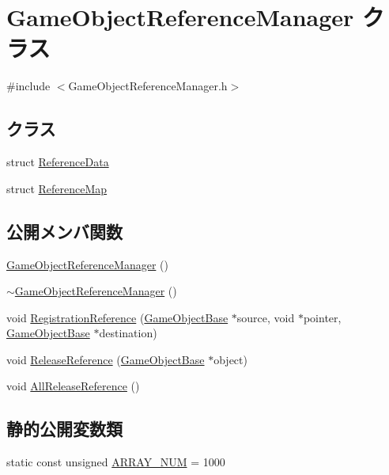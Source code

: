 \hypertarget{class_game_object_reference_manager}{}\section{Game\+Object\+Reference\+Manager クラス}
\label{class_game_object_reference_manager}


{\ttfamily \#include $<$Game\+Object\+Reference\+Manager.\+h$>$}

\subsection*{クラス}
\begin{DoxyCompactItemize}
\item 
struct \mbox{\hyperlink{struct_game_object_reference_manager_1_1_reference_data}{Reference\+Data}}
\item 
struct \mbox{\hyperlink{struct_game_object_reference_manager_1_1_reference_map}{Reference\+Map}}
\end{DoxyCompactItemize}
\subsection*{公開メンバ関数}
\begin{DoxyCompactItemize}
\item 
\mbox{\hyperlink{class_game_object_reference_manager_aed165af9f1a16894c65f974945020cda}{Game\+Object\+Reference\+Manager}} ()
\item 
\mbox{\hyperlink{class_game_object_reference_manager_a9ed62220afb840cdc3e8cbe4bbc3a19e}{$\sim$\+Game\+Object\+Reference\+Manager}} ()
\item 
void \mbox{\hyperlink{class_game_object_reference_manager_a4195eafdda534044454b6d48efc7d03d}{Registration\+Reference}} (\mbox{\hyperlink{class_game_object_base}{Game\+Object\+Base}} $\ast$source, void $\ast$pointer, \mbox{\hyperlink{class_game_object_base}{Game\+Object\+Base}} $\ast$destination)
\item 
void \mbox{\hyperlink{class_game_object_reference_manager_ac7d117427de3052f893228408a3de5d7}{Release\+Reference}} (\mbox{\hyperlink{class_game_object_base}{Game\+Object\+Base}} $\ast$object)
\item 
void \mbox{\hyperlink{class_game_object_reference_manager_ac4852ddd6d8bd5e1f13284ba6204e221}{All\+Release\+Reference}} ()
\end{DoxyCompactItemize}
\subsection*{静的公開変数類}
\begin{DoxyCompactItemize}
\item 
static const unsigned \mbox{\hyperlink{class_game_object_reference_manager_a962d30b10c5b76353645773b2c1740ce}{A\+R\+R\+A\+Y\+\_\+\+N\+UM}} = 1000
\end{DoxyCompactItemize}


